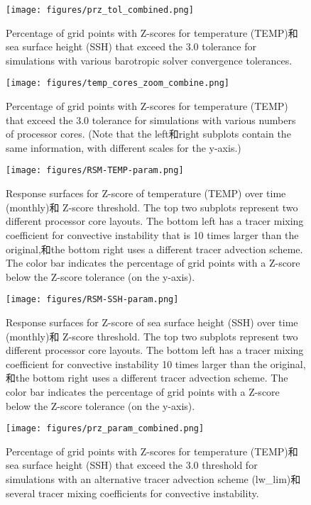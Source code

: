 \begin{figure}[h]
\centering 
\texttt{[image: figures/prz\_tol\_combined.png]}
\caption {Percentage of grid points with Z-scores for temperature
  (TEMP)和sea surface height (SSH) that exceed the 3.0 tolerance for simulations with various barotropic solver convergence tolerances. }
\label {fig:PRZ-tol}
\end{figure}

\begin{figure}[h]
\texttt{[image: figures/temp\_cores\_zoom\_combine.png]}
\caption{Percentage of grid points with Z-scores for temperature (TEMP) that exceed the 3.0 tolerance for simulations with various numbers of processor cores. (Note that the left和right subplots contain the same information, with different scales for the y-axis.)}
\label {fig:combine}
\end{figure}

\begin {figure}[h]
\centering
\texttt{[image: figures/RSM-TEMP-param.png]}
\caption {Response surfaces for Z-score of temperature (TEMP) over time (monthly)和 Z-score threshold.  The top two subplots represent two different processor core layouts.
The bottom left has a tracer mixing coefficient for convective instability that is 10 times larger than the original,和the bottom right uses a different tracer advection scheme. The color bar indicates the percentage of grid points with a Z-score below the Z-score tolerance (on the y-axis).}
\label{fig:RSM-TEMP-param}
\end {figure}

\begin {figure}[h]
\centering
\texttt{[image: figures/RSM-SSH-param.png]}
\caption {Response surfaces for Z-score of sea surface height (SSH) over time (monthly)和 Z-score threshold.  The top two subplots represent two different processor core layouts.
The bottom left has a tracer mixing coefficient for convective instability 10 times larger than the original,和the bottom right uses a different tracer advection scheme. The color bar indicates the percentage of grid points with a Z-score below the Z-score tolerance (on the y-axis).}
\label{fig:RSM-SSH-param}
\end {figure}


\begin{figure}[h]
\centering
\texttt{[image: figures/prz\_param\_combined.png]}
\caption{Percentage of grid points with Z-scores for temperature
  (TEMP)和sea surface height (SSH) that exceed the 3.0 threshold for simulations with an alternative tracer advection scheme (lw\_lim)和several tracer mixing coefficients for convective instability.}
\label {fig:PRZ-temp-param}
\end{figure}


